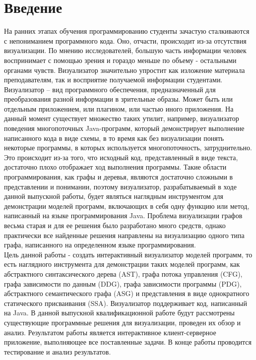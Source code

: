 \chapter*{Введение} %

На ранних этапах обучения программированию студенты зачастую сталкиваются с непониманием программного кода. Оно, отчасти, происходит из-за отсутствия визуализации. По мнению исследователей, большую часть информации человек воспринимает с помощью зрения и гораздо меньше по объему - остальными органами чувств. Визуализатор значительно упростит как изложение материала преподавателям, так и восприятие получаемой информации студентами. Визуализатор – вид программного обеспечения, предназначенный для преобразования разной информации в зрительные образы. Может быть или отдельным приложением, или плагином, или частью иного приложения. На данный момент существует множество таких утилит, например, визуализатор поведения многопоточных Java-программ, который демонстрирует выполнение написанного кода в виде схемы, в то время как без визуализации понять некоторые программы, в которых используется многопоточность, затруднительно. Это происходит из-за того, что исходный код, представленный в виде текста, достаточно плохо отображает ход выполнения программы.
Такие области программирования, как графы и деревья, являются достаточно сложными в представлении и понимании, поэтому визуализатор, разрабатываемый в ходе данной выпускной работы, будет являться наглядным инструментом для демонстрации моделей программ, включающих в себя одну функцию или метод, написанный на языке программирования Java. Проблема визуализации графов весьма старая и для ее решения было разработано много средств, однако практически все найденные решения направлены на визуализацию одного типа графа, написанного на определенном языке программирования.\\
Цель данной работы - создать интерактивный визуализатор моделей программ, то есть наглядного инструмента для демонстрации таких моделей программ, как абстрактного синтаксического дерева (AST), графа потока управления (CFG), графа зависимости по данным (DDG), графа зависимости программы (PDG), абстрактного семантического графа (ASG) и представления в виде однократного статического присваивания (SSA). Визуализатор поддерживает код, написанный на Java.
В данной выпускной квалификационной работе будут рассмотрены существующие программные решения для визуализации, проведен их обзор и анализ. Результатом работы является интерактивное клиент-серверное приложение, выполняющее все поставленные задачи. В конце работы проводится тестирование и анализ результатов.  


